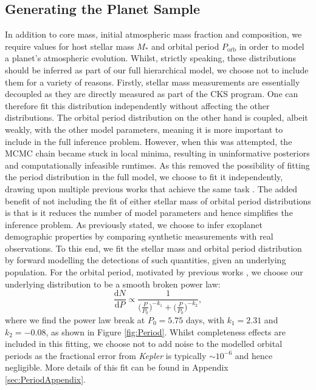 \documentclass[fleqn,usenatbib]{mnras}
\begin{document}
\subsection{Generating the Planet Sample} \label{sec:DrawingPlanets}
In addition to core mass, initial atmospheric mass fraction and composition, we require values for host stellar mass $M_*$ and orbital period $P_\text{orb}$ in order to model a planet's atmospheric evolution. Whilst, strictly speaking, these distributions should be inferred as part of our full hierarchical model, we choose not to include them for a variety of reasons. Firstly, stellar mass measurements are essentially decoupled as they are directly measured as part of the CKS program. One can therefore fit this distribution independently without affecting the other distributions. The orbital period distribution on the other hand is coupled, albeit weakly, with the other model parameters, meaning it is more important to include in the full inference problem. However, when this was attempted, the MCMC chain became stuck in local minima, resulting in uninformative posteriors and computationally infeasible runtimes. As this removed the possibility of fitting the period distribution in the full model, we choose to fit it independently, drawing upon multiple previous works that achieve the same task \citep[e.g.][]{Fressin2013,Howard2012,Petigura2018}. The added benefit of not including the fit of either stellar mass of orbital period distributions is that is it reduces the number of model parameters and hence simplifies the inference problem. As previously stated, we choose to infer exoplanet demographic properties by comparing synthetic measurements with real observations. To this end, we fit the stellar mass and orbital period distribution by forward modelling the detections of such quantities, given an underlying population. For the orbital period, motivated by previous works \citep[e.g.][]{Fressin2013,Howard2012,Dressing2015b,Petigura2018}, we choose our underlying distribution to be a smooth broken power law:
\begin{equation} \label{eq:period}
    \frac{\mathrm{d}N}{\mathrm{d}P} \propto \frac{1}{\big(\frac{P}{P_0}\big)^{-k_1} + \big(\frac{P}{P_0}\big)^{-k_2}},
\end{equation}
where we find the power law break at $P_0 = 5.75$ days, with $k_1 = 2.31$ and $k_2 = -0.08$, as shown in Figure \ref{fig:Period}. Whilst completeness effects are included in this fitting, we choose not to add noise to the modelled orbital periods as the fractional error from \textit{Kepler} is typically $\sim 10^{-6}$ and hence negligible. More details of this fit can be found in Appendix \ref{sec:PeriodAppendix}.
\end{document}
